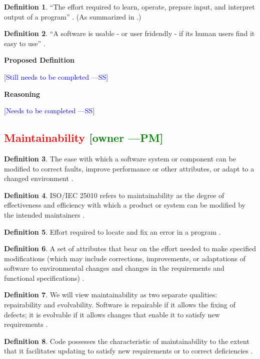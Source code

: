 \documentclass[letterpaper,cleveref]{lipics-v2019}
\newcommand{\authornote}[3]{\textcolor{#1}{[#3 ---#2]}}
\newcommand{\authornote}[3]{}
\newcommand{\wss}[1]{\authornote{blue}{SS}{#1}} %
\newcommand{\pmi}[1]{\authornote{green}{PM}{#1}} %
\newcommand{\notdone}[1]{\textcolor{red}{#1}}
\theoremstyle{definition}
\newtheorem{defn}{Definition}
\begin{document}
\begin{defn}
	``The effort required to learn, operate, prepare input, and interpret output
	of a program'' \citep{McCallEtAl1977}. (As summarized in
	\citet{VanVliet2000}.)
\end{defn}

\begin{defn}
	``A software is usable - or user fridendly - if its human users find it easy to
	use'' \citep{ghezzi1991fundamentals}.
\end{defn}

\noindent \textbf{Proposed Definition}

\wss{Still needs to be completed}

\noindent \textbf{Reasoning}

\wss{Needs to be completed}

\subsection{\notdone{Maintainability} \pmi{owner}}

\begin{defn} \label{MaintainabilityDefnSelected1}
	The ease with which a software system or component can be modified to correct
	faults, improve performance or other attributes, or adapt to a changed
	environment \citep{IEEEStdGlossarySET1990}. 
\end{defn}
\begin{defn}
	ISO/IEC 25010 refers to maintainability as the degree of effectiveness and
	efficiency with which a product or system can be modified by the intended
	maintainers \citep{ISO/IEC25010}.
\end{defn}
\begin{defn}
	Effort required to locate and fix an error in a program
	\citep{pressman2005software}.
\end{defn}
\begin{defn}
	A set of attributes that bear on the effort needed to make specified
	modifications (which may include corrections, improvements, or adaptations of
	software to environmental changes and changes in the requirements and functional
	specifications) \citep{pfleeger2006software}.
\end{defn}
\begin{defn}
	We will view maintainability as two separate qualities: repairability and
	evolvability. Software is repairable if it allows the fixing of defects; it is
	evolvable if it allows changes that enable it to satisfy new requirements
	\citep{ghezzi1991fundamentals}.
\end{defn}
\begin{defn} \label{MaintainabilityDefnSelected2}
	Code possesses the characteristic of maintainability to the extent that it
	facilitates updating to satisfy new requirements or to correct deficiencies
	\citep{boehm2007software}.
\end{defn}
\end{document}
